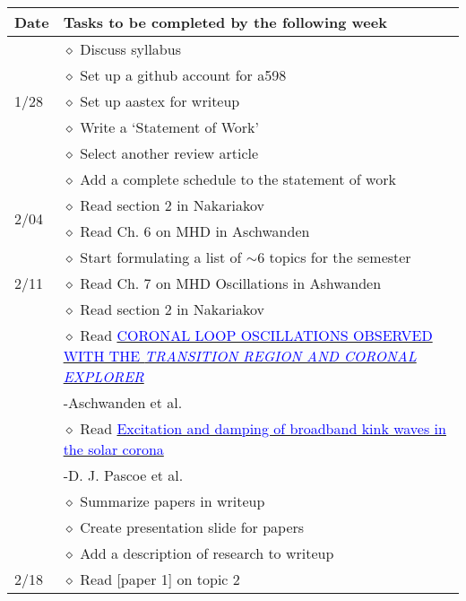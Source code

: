 \documentclass[12pt]{article}
\begin{document}
\begin{table}[ht]
    \centering
    \begin{tabular}{m{0.5in} m{5.5in}}
    \textbf{Date}
        & \textbf{Tasks to be completed by the following week}\\
    \hline\hline
    \multirow{5}{*}{1/28}
            & $\diamond$ Discuss syllabus\\
            & $\diamond$ Set up a github account for a598\\ 
             & $\diamond$ Set up aastex for writeup\\
             & $\diamond$ Write a `Statement of Work'\\
             & $\diamond$ Select another review article\\
    \hline
    \multirow{4}{*}{2/04}
        & $\diamond$ Add a complete schedule to the statement of work\\
        & $\diamond$ Read section 2 in Nakariakov\\
        & $\diamond$ Read Ch. 6 on MHD in Aschwanden\\
        & $\diamond$ Start formulating a list of $\sim$6 topics
            for the semester\\
    \hline
    2/11 & $\diamond$ Read Ch. 7 on MHD Oscillations in Ashwanden\\
         & $\diamond$ Read section 2 in Nakariakov\\
         & $\diamond$ Read
         \href{http://cdsads.u-strasbg.fr/abs/2015A\%26A...578A..99P}
         {\textcolor{blue}{CORONAL LOOP OSCILLATIONS OBSERVED WITH THE 
         \emph{TRANSITION REGION AND CORONAL EXPLORER}}}\\
         & \hspace{1cm}-Aschwanden et al.\\
         & $\diamond$ Read
         \href{http://iopscience.iop.org/article/10.1086/307502/meta}
         {\textcolor{blue}{Excitation and damping of broadband
         kink waves in the solar corona}}\\ & \hspace{1cm}-D. J. Pascoe et al.\\
         & $\diamond$ Summarize papers in writeup\\
         & $\diamond$ Create presentation slide for papers\\
         & $\diamond$ Add a description of research to writeup\\
    \hline
    2/18 & $\diamond$ Read [paper 1] on topic 2\\

\end{tabular}
\end{table}
\end{document}
